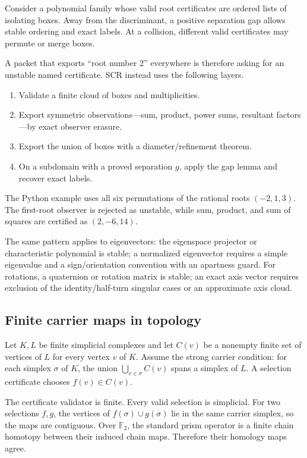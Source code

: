 Consider a polynomial family whose valid root certificates are ordered lists
of isolating boxes.  Away from the discriminant, a positive separation gap
allows stable ordering and exact labels.  At a collision, different valid
certificates may permute or merge boxes.

A packet that exports ``root number 2'' everywhere is therefore asking for an
unstable named certificate.  SCR instead uses the following layers.
\begin{enumerate}[label=(\roman*)]
\item Validate a finite cloud of boxes and multiplicities.
\item Export symmetric observations---sum, product, power sums, resultant
      factors---by exact observer erasure.
\item Export the union of boxes with a diameter/refinement theorem.
\item On a subdomain with a proved separation \(g\), apply the gap lemma and
      recover exact labels.
\end{enumerate}
The Python example uses all six permutations of the rational roots
\((-2,1,3)\).  The first-root observer is rejected as unstable, while sum,
product, and sum of squares are certified as \((2,-6,14)\).

The same pattern applies to eigenvectors: the eigenspace projector or
characteristic polynomial is stable; a normalized eigenvector requires a
simple eigenvalue and a sign/orientation convention with an apartness guard.
For rotations, a quaternion or rotation matrix is stable; an exact axis vector
requires exclusion of the identity/half-turn singular cases or an approximate
axis cloud.

\subsection{Finite carrier maps in topology}

Let \(K,L\) be finite simplicial complexes and let \(C(v)\) be a nonempty
finite set of vertices of \(L\) for every vertex \(v\) of \(K\).  Assume the
strong carrier condition: for each simplex \(\sigma\) of \(K\), the union
\(\bigcup_{v\in\sigma}C(v)\) spans a simplex of \(L\).  A selection certificate
chooses \(f(v)\in C(v)\).

The certificate validator is finite.  Every valid selection is simplicial.
For two selections \(f,g\), the vertices of \(f(\sigma)\cup g(\sigma)\) lie in
the same carrier simplex, so the maps are contiguous.  Over \(\mathbb F_2\),
the standard prism operator is a finite chain homotopy between their induced
chain maps.  Therefore their homology maps agree.

